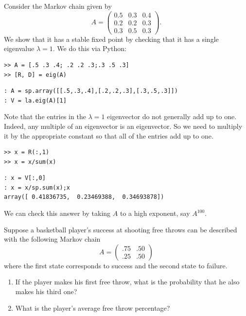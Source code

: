 Consider the Markov chain given by
\[
A = \begin{pmatrix}
0.5 & 0.3 & 0.4\\
0.2 & 0.2 & 0.3\\
0.3 & 0.5 & 0.3
\end{pmatrix}.
\]
We show that it has a stable fixed point by checking that it has a single eigenvalue $\lambda=1$.  We do this via Python:
\begin{matlab}
\begin{lstlisting}[style=matlab]
  >> A = [.5 .3 .4; .2 .2 .3;.3 .5 .3]
>> [R, D] = eig(A)
\end{lstlisting}
\end{matlab}
\begin{python}
\begin{lstlisting}[style=python]
: A = sp.array([[.5,.3,.4],[.2,.2,.3],[.3,.5,.3]])
: V = la.eig(A)[1]
\end{lstlisting}
\end{python}
Note that the entries in the $\lambda=1$ eigenvector do not generally add up to one.  Indeed, any multiple of an eigenvector is an eigenvector.  So we need to multiply it by the appropriate constant so that all of the entries add up to one.
\begin{matlab}
\begin{lstlisting}[style=matlab]
>> x = R(:,1)
>> x = x/sum(x)
\end{lstlisting}
\end{matlab}
\begin{python}
\begin{lstlisting}[style=python]
: x = V[:,0]
: x = x/sp.sum(x);x
array([ 0.41836735,  0.23469388,  0.34693878])
\end{lstlisting}
\end{python}
We can check this answer by taking $A$ to a high exponent, say $A^{100}$.

\begin{problem}
Suppose a basketball player's success at shooting free throws can be
described with the following Markov chain
\[
A = \begin{pmatrix}.75&.50\\.25&.50\end{pmatrix}
\]
where the first state corresponds to success and the second state to failure.
\begin{enumerate}
\item If the player makes his first free throw, what is the probability that he also makes his third one?
\item What is the player's average free throw percentage?
\end{enumerate}
\end{problem}

